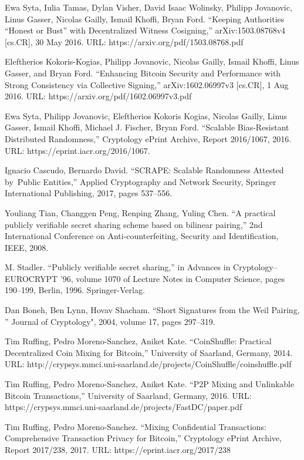 \documentclass[a4paper, 10pt, conference]{ieeeconf}
\begin{document}
\begin{thebibliography}{99}
 Ewa Syta, Iulia Tamas, Dylan Visher, David Isaac Wolinsky, Philipp Jovanovic, Linus Gasser, Nicolas Gailly, Ismail Khoffi, Bryan Ford. ``Keeping Authorities “Honest or Bust” with Decentralized Witness Cosigning,'' arXiv:1503.08768v4 [cs.CR], 30 May 2016. URL: https://arxiv.org/pdf/1503.08768.pdf

 Eleftherios Kokoris-Kogias, Philipp Jovanovic, Nicolas Gailly,
Ismail Khoffi, Linus Gasser, and Bryan Ford. ``Enhancing Bitcoin Security and Performance with Strong Consistency via Collective Signing,'' arXiv:1602.06997v3 [cs.CR], 1 Aug 2016. URL: https://arxiv.org/pdf/1602.06997v3.pdf

 Ewa Syta, Philipp Jovanovic, Eleftherios Kokoris Kogias, Nicolas Gailly, Linus Gasser, Ismail Khoffi, Michael J. Fischer, Bryan Ford. ``Scalable Bias-Resistant Distributed Randomness,'' Cryptology ePrint Archive, Report 2016/1067, 2016. URL: https://eprint.iacr.org/2016/1067.

 Ignacio Cascudo, Bernardo David. ``SCRAPE: Scalable Randomness Attested by Public Entities,'' Applied Cryptography and Network Security, Springer International Publishing, 2017, pages 537--556.

 Youliang Tian, Changgen Peng, Renping Zhang, Yuling Chen. ``A practical publicly verifiable secret sharing scheme based on bilinear pairing,'' 2nd International Conference on Anti-counterfeiting, Security and Identification, IEEE, 2008.

 M. Stadler. ``Publicly verifiable secret sharing,'' in Advances in Cryptology--EUROCRYPT ’96, volume 1070 of Lecture Notes in Computer Science, pages 190--199, Berlin, 1996. Springer-Verlag.

 Dan Boneh, Ben Lynn, Hovav Shacham. ``Short Signatures from the Weil Pairing, '' Journal of Cryptology", 2004, volume 17, pages 297--319.

 Tim Ruffing, Pedro Moreno-Sanchez, Aniket Kate. ``CoinShuffle: Practical Decentralized Coin Mixing for Bitcoin,'' University of Saarland, Germany, 2014. URL: http://crypsys.mmci.uni-saarland.de/projects/CoinShuffle/coinshuffle.pdf

 Tim Ruffing, Pedro Moreno-Sanchez, Aniket Kate. ``P2P Mixing and Unlinkable Bitcoin Transactions,'' University of Saarland, Germany, 2016. URL: https://crypsys.mmci.uni-saarland.de/projects/FastDC/paper.pdf

 Tim Ruffing, Pedro Moreno-Sanchez. ``Mixing Confidential Transactions: Comprehensive Transaction Privacy for Bitcoin,'' Cryptology ePrint Archive, Report 2017/238, 2017. URL: https://eprint.iacr.org/2017/238


\end{thebibliography}
\end{document}
